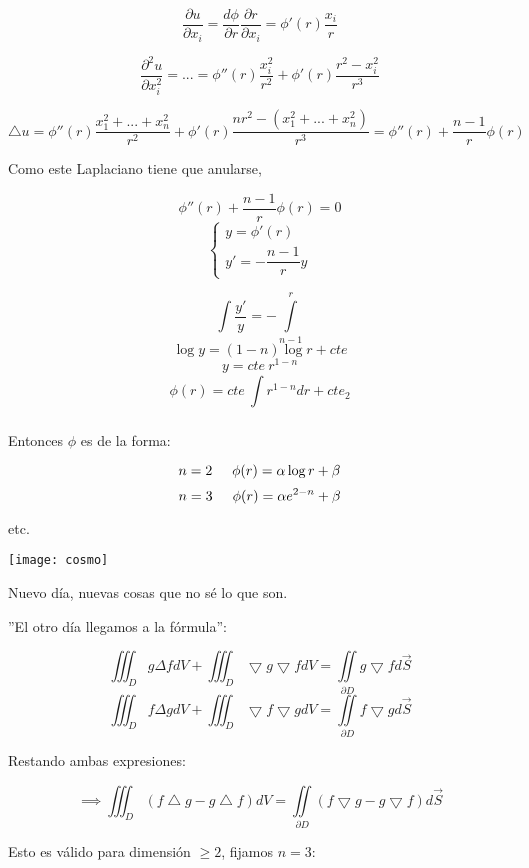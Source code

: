 \documentclass[openany]{book}
\begin{document}
$$ \dfrac{\partial u}{\partial x_i} = \dfrac{d\phi}{\partial r} \dfrac{\partial r}{\partial x_i} = \phi'(r)\dfrac{x_i}{r} $$

$$ \dfrac{\partial ^2u}{\partial x_i^2} = ... = \phi''(r) \dfrac{x_i^2}{r^2}+\phi'(r) \dfrac{r^2-x_i^2}{r^3} $$

$$ \bigtriangleup u = \phi''(r) \dfrac{x_1^2+...+x_n^2}{r^2} +\phi'(r) \dfrac{nr^2-(x_1^2+...+x_n^2)}{r^3} = \phi''(r) + \dfrac{n-1}{r}\phi(r) $$

Como este Laplaciano tiene que anularse,

$$ \phi''(r) + \dfrac{n-1}{r}\phi(r) = 0 $$
$$ \left\{
\begin{array}{l}
  y = \phi'(r)\\ 
  y' = -\dfrac{n-1}{r}y
\end{array}
\right. $$

$$ \int\limits_{}^{}\dfrac{y'}{y} = - \int\limits_{n-1}^{r} $$
$$ \log{y} = (1-n)\log{r}+cte $$
$$ y = cte\ r^{1-n} $$
$$ \phi(r) = cte\ \int\limits_{}^{}r^{1-n}dr + cte_{2} $$

Entonces $ \phi $ es de la forma:

$$ n= 2 \hspace{5mm} \phi(r) = \alpha \log{r}+\beta  $$
$$ n= 3 \hspace{5mm} \phi(r) = \alpha e^{2-n}+\beta  $$

etc.


\begin{minipage}[l]{0.1\textwidth}
  \texttt{[image: cosmo]}
  \end{minipage}
  \begin{minipage}[l]{0.8\textwidth}
  Nuevo día, nuevas cosas que no sé lo que son.
\end{minipage}

''El otro día llegamos a la fórmula'':

$$ \iiint_{D}g \Delta f dV + \iiint_{D}\bigtriangledown g \bigtriangledown f dV = \iint\limits_{\partial D} g \bigtriangledown f d\overrightarrow{S} $$
$$ \iiint_{D}f \Delta g dV + \iiint_{D}\bigtriangledown f \bigtriangledown g dV = \iint\limits_{\partial D} f \bigtriangledown g d\overrightarrow{S} $$

Restando ambas expresiones:

$$ \implies\iiint_{D}(f\bigtriangleup g - g\bigtriangleup f)dV = \iint\limits_{\partial D} (f\bigtriangledown g-g\bigtriangledown f)d\overrightarrow{S}$$


Esto es válido para dimensión $ \geq 2 $, fijamos $ n = 3 $:
\end{document}
